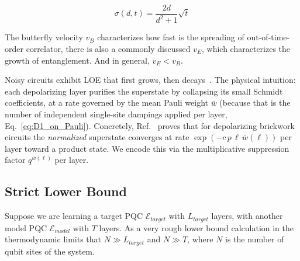 \documentclass[%
 reprint,
superscriptaddress,
 amsmath,amssymb,
 aps,
]{revtex4-2}
\newcommand{\E}{\mathcal{E}}
\begin{document}
\begin{equation}
    \sigma(d, t) = \frac{2d}{d^2+1}\sqrt{t}
\end{equation}





The butterfly velocity $v_B$ characterizes how fast is the spreading of out-of-time-order correlator, there is also a commonly discussed $v_E$, which characterizes the growth of entanglement. And in general, $v_E<v_B$.


Noisy circuits exhibit LOE that first grows, then decays~\cite{LOE_EE_Decreasing1, noh2020efficient}. The physical intuition: each depolarizing layer purifies the superstate by collapsing its small Schmidt coefficients, at a rate governed by the mean Pauli weight $\bar w$ (because that is the number of independent single-site dampings applied per layer, Eq.~\eqref{eq:D1_on_Pauli}). Concretely, Ref.~\cite{noh2020efficient} proves that for depolarizing brickwork circuits the \emph{normalized} superstate converges at rate $\exp(-c\,p\,\ell\,\bar w(\ell))$ per layer toward a product state. We encode this via the multiplicative suppression factor $q^{\bar w(\ell)}$ per layer.

\subsection{Strict Lower Bound}
Suppose we are learning a target PQC $\E_{target}$ with $L_{target}$ layers, with another model PQC $\E_{model}$ with $T$ layers. As a very rough lower bound calculation in the thermodynamic limits that $N\gg L_{target}$ and $N\gg T$, where $N$ is the number of qubit sites of the system. 
\end{document}
